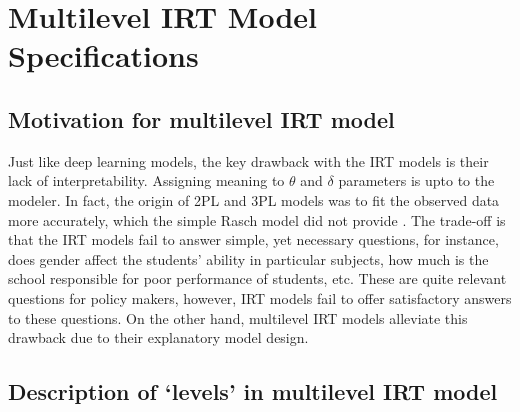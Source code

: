 \documentclass[12pt]{article}
\begin{document}
\section{Multilevel IRT Model Specifications} \label{sec:mlirt}
\subsection{Motivation for multilevel IRT model}
Just like deep learning models, the key drawback with the IRT models is their lack of interpretability. Assigning meaning to $\theta$ and $\delta$ parameters is upto to the modeler. In fact, the origin of 2PL and 3PL models was to fit the observed data more accurately, which the simple Rasch model did not provide \cite{de2013theory}. The trade-off is that the IRT models fail to answer simple, yet necessary questions, for instance, does gender affect the students' ability in particular subjects, how much is the school responsible for poor performance of students, etc. These are quite relevant questions for policy makers, however, IRT models fail to offer satisfactory answers to these questions. On the other hand, multilevel IRT models alleviate this drawback due to their explanatory model design.

    
    

\subsection{Description of `levels' in multilevel IRT model}
\end{document}
